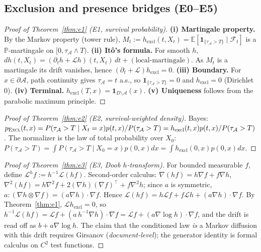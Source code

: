 \documentclass[11pt]{article}
\newcommand{\Aregion}{\mathcal{A}}
\newcommand{\ind}{\mathbf{1}}
\newcommand{\E}[1]{\mathbb{E}\left[#1\right]}
\newcommand{\Excl}{\textsc{Excl}}
\begin{document}
\subsection{Exclusion and presence bridges (E0--E5)}

\begin{proof}[Proof of Theorem~\ref{thm:e1} (E1, survival probability)]
\textbf{(i) Martingale property.} By the Markov property (tower rule),
$M_t:=h_{\mathrm{excl}}(t,X_t)=\E{\ind_{\{\tau_{\Aregion}>T\}}\mid\mathcal{F}_t}$ is a
$\mathbb{P}$-martingale on $[0,\tau_{\Aregion}\wedge T)$.
\textbf{(ii) It\^o's formula.} For smooth $h$,
$dh(t,X_t)=(\partial_t h+\mathcal{L}h)(t,X_t)\,dt+(\text{local-martingale})$. As $M_t$ is
a martingale its drift vanishes, hence $(\partial_t+\mathcal{L})h_{\mathrm{excl}}=0$.
\textbf{(iii) Boundary.} For $x\in\partial\Aregion$, path continuity gives
$\tau_{\Aregion}=t$ a.s., so $\ind_{\{\tau_{\Aregion}>T\}}=0$ and $h_{\mathrm{excl}}=0$
(Dirichlet $0$). \textbf{(iv) Terminal.} $h_{\mathrm{excl}}(T,x)=\ind_{D\setminus\Aregion}(x)$.
\textbf{(v) Uniqueness} follows from the parabolic maximum principle.
\end{proof}

\begin{proof}[Proof of Theorem~\ref{thm:e2} (E2, survival-weighted density)]
Bayes: $p_{\Excl}(t,x)=P(\tau_{\Aregion}>T\mid X_t=x)p(t,x)/P(\tau_{\Aregion}>T)
=h_{\mathrm{excl}}(t,x)p(t,x)/P(\tau_{\Aregion}>T)$. The normalizer is the law of total
probability over $X_0$: $P(\tau_{\Aregion}>T)=\int P(\tau_{\Aregion}>T\mid
X_0=x)p(0,x)dx=\int h_{\mathrm{excl}}(0,x)p(0,x)dx$.
\end{proof}

\begin{proof}[Proof of Theorem~\ref{thm:e3} (E3, Doob $h$-transform)]
For bounded measurable $f$, define $\mathcal{L}^h f:=h^{-1}\mathcal{L}(hf)$. Second-order
calculus: $\nabla(hf)=h\nabla f+f\nabla h$,
$\nabla^2(hf)=h\nabla^2 f+2(\nabla h)(\nabla f)^\top+f\nabla^2 h$; since $a$ is symmetric,
$a:(\nabla h\otimes\nabla f)=(a\nabla h)\cdot\nabla f$. Hence
$\mathcal{L}(hf)=h\mathcal{L}f+f\mathcal{L}h+(a\nabla h)\cdot\nabla f$. By
Theorem~\ref{thm:e1}, $\mathcal{L}h_{\mathrm{excl}}=0$, so
$h^{-1}\mathcal{L}(hf)=\mathcal{L}f+(a\,h^{-1}\nabla h)\cdot\nabla f
=\mathcal{L}f+(a\nabla\log h)\cdot\nabla f$, and the drift is read off as
$b+a\nabla\log h$. The claim that the conditioned law \emph{is} a Markov diffusion with
this drift requires Girsanov (\emph{document-level}); the generator identity is formal
calculus on $C^2$ test functions.
\end{proof}
\end{document}
